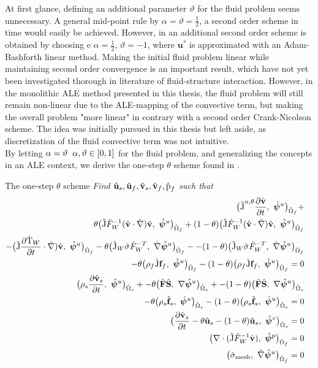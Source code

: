 At first glance, defining an additional parameter $\vartheta$ for the fluid problem seems unnecessary. A general mid-point rule by $\alpha = \vartheta = \frac{1}{2}$, a second order scheme in time would easily be achieved. However, in \cite{Simo1994} an additional second order scheme is obtained by choosing e $\alpha = \frac{1}{2}$, $\vartheta =-1$, where $\mathbf{u}^{*}$ is approximated with an Adam-Bashforth linear method. Making the initial fluid problem linear while maintaining second order convergence is an important result, which have not yet been investigated thorough in literature of fluid-structure interaction. However, in the monolithic ALE method presented in this thesis, the fluid problem will still remain non-linear due to the ALE-mapping of the convective term, but making the overall problem "more linear" in contrary with a second order Crank-Nicolson scheme. The idea was initially pursued in this thesis but left aside, as discretization of the fluid convective term was not intuitive. \\
By letting $\alpha = \vartheta \hspace{2mm} \alpha, \vartheta \in [0, 1] $ for the fluid problem, and generalizing the concepts in an ALE context, we derive the one-step $\theta$ scheme found in \cite{Wicka}.
\begin{prob}
The one-step $\theta$ scheme 
\textit{Find $\hat{\mathbf{u}}_s, \hat{\mathbf{u}}_f, \hat{\mathbf{v}}_s, \hat{\mathbf{v}}_f, \text{\^{p}}_f $ such that}
\begin{align*}
\big(\text{\^{J}}^{n, \theta} \frac{\partial \hat{\mathbf{v}}}{\partial t}, \ \hat{\bm{\psi}}^u \big)_{\hat{\Omega}_f} + \\
\theta \big(\text{\^{J}} \hat{F}_W^{-1}(\hat{\mathbf{v}} \cdot \hat{\nabla}) \hat{\mathbf{v}}, \ {\hat{\bm{\psi}}^u} \big)_{\hat{\Omega}_f} + 
(1 - \theta) \big(\text{\^{J}} \hat{F}_W^{-1}(\hat{\mathbf{v}} \cdot \hat{\nabla}) \hat{\mathbf{v}}, \ {\hat{\bm{\psi}}^u} \big)_{\hat{\Omega}_f} \\
- \big(\text{\^{J}}  \frac{\partial \text{\^{T}}_W}{\partial t} \cdot \hat{\nabla}) \hat{\mathbf{v}}, \ {\hat{\bm{\psi}}^u} \big)_{\hat{\Omega}_f}
-\theta \big(\text{\^{J}}_W \hat{\sigma}\hat{F}_W^{-T}, \ {\hat{\nabla}\hat{\bm{\psi}}^u} \big)_{\hat{\Omega}_f} -
- (1 - \theta) \big(\text{\^{J}}_W \hat{\sigma}\hat{F}_W^{-T}, \ {\hat{\nabla}\hat{\bm{\psi}}^u} \big)_{\hat{\Omega}_f} \\
- \theta \big(\rho_f \text{\^{J}} \mathbf{f}_f, \ {{\hat{\bm{\psi}}^u}} \big)_{\hat{\Omega}_f} - 
(1 - \theta) \big(\rho_f \text{\^{J}} \mathbf{f}_f, \ {{\hat{\bm{\psi}}^u}} \big)_{\hat{\Omega}_f}= 0& \\
\big(\rho_s \frac{\partial \hat{\mathbf{v}}_s}{\partial t}, \ {\hat{\bm{\psi}}^u} \big)_{\hat{\Omega}_s} + 
- \theta\big(\hat{\mathbf{F}}\hat{\mathbf{S}}, \ {\nabla \hat{\bm{\psi}}^u} \big)_{\hat{\Omega}_s}  + 
- (1 - \theta) \big(\hat{\mathbf{F}}\hat{\mathbf{S}}, \ {\nabla \hat{\bm{\psi}}^u} \big)_{\hat{\Omega}_s} \\
- \theta \big(\rho_s \hat{\mathbf{f}}_s, \ {\hat{\bm{\psi}}^u} \big)_{\hat{\Omega}_s} 
- (1 - \theta) \big(\rho_s \hat{\mathbf{f}}_s, \ {\hat{\bm{\psi}}^u} \big)_{\hat{\Omega}_s} = 0 \\
\big(\frac{\partial \hat{\mathbf{v}}_s}{\partial t} - \theta \hat{\mathbf{u}}_s - (1 - \theta)\hat{\mathbf{u}}_s, \ {\hat{\bm{\psi}}^v} \big)_{\hat{\Omega}_s}  = 0&\\
\big(\nabla \cdot (\text{\^{J}} \hat{F}_W^{-1} \hat{\mathbf{v}}), \ {\hat{\bm{\psi}}^p} \big)_{\hat{\Omega}_f} = 0& \\
\big(\hat{\sigma}_{\text{mesh}}, \ {\hat{\nabla}\hat{\bm{\psi}}^u} \big)_{\hat{\Omega}_f} = 0&
\end{align*} 
\end{prob}
